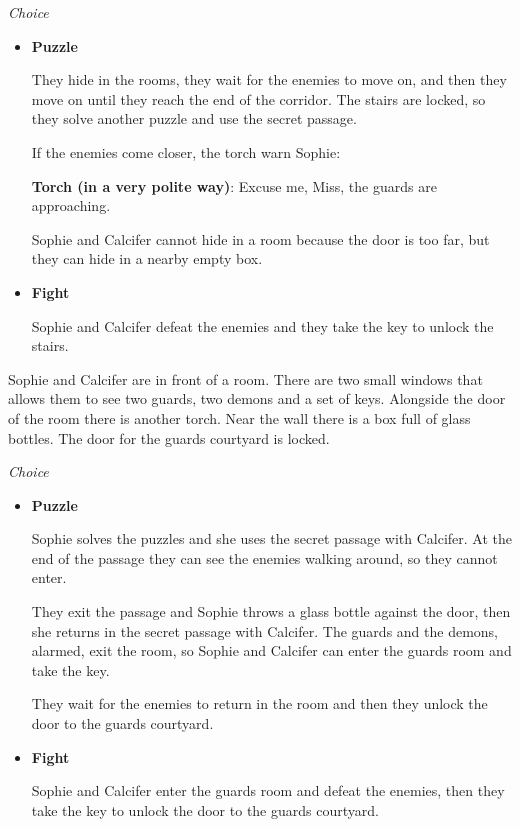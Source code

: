 \textit{Choice}
\begin{itemize}
  \item \textbf{Puzzle}
  
  They hide in the rooms, they wait for the enemies to move on, and then they move on until they reach the end of the corridor. The stairs are locked, so they solve another puzzle and use the secret passage.
  
  If the enemies come closer, the torch warn Sophie:
  
  \textbf{Torch (in a very polite way)}: Excuse me, Miss, the guards are approaching.
  
  Sophie and Calcifer cannot hide in a room because the door is too far, but they can hide in a nearby empty box.

  \item \textbf{Fight}
  
  Sophie and Calcifer defeat the enemies and they take the key to unlock the stairs.
\end{itemize}


Sophie and Calcifer are in front of a room. There are two small windows that allows them to see two guards, two demons and a set of keys. Alongside the door of the room there is another torch. Near the wall there is a box full of glass bottles. The door for the guards courtyard is locked.

\textit{Choice}
\begin{itemize}
  \item \textbf{Puzzle}
  
  Sophie solves the puzzles and she uses the secret passage with Calcifer. At the end of the passage they can see the enemies walking around, so they cannot enter.
  
  They exit the passage and Sophie throws a glass bottle against the door, then she returns in the secret passage with Calcifer. The guards and the demons, alarmed, exit the room, so Sophie and Calcifer can enter the guards room and take the key.
  
  They wait for the enemies to return in the room and then they unlock the door to the guards courtyard.

  \item \textbf{Fight}
  
  Sophie and Calcifer enter the guards room and defeat the enemies, then they take the key to unlock the door to the guards courtyard.
\end{itemize}

